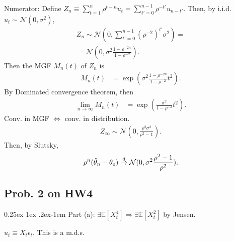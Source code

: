 \documentclass[9pt]{extarticle}
\makeatletter
\newcommand{\EE}{\mathbb{E}}
\renewcommand{\paragraph}{%
  \@startsection{paragraph}{4}%
  {\z@}{0.25ex \@plus 1ex \@minus .2ex}{-1em}%
  {\normalfont\normalsize\bfseries}%
}
\newcommand{\darrow}{\overset{d}{\rightarrow}}
\makeatother
\begin{document}
\begin{multicols*}{4}
Numerator: Define $Z_n \equiv \sum_{t=1}^n \rho^{t-n} u_t = \sum_{t'=0}^{n-1} \rho^{-t'} u_{n-t'}$. Then, by i.i.d. $u_t \sim \mathcal{N}(0, \sigma^2)$,
\begin{gather*}
    Z_n \sim \mathcal{N}(0, \sum_{t'=0}^{n-1} (\rho^{-2})^{t'}\sigma^2) = \\
    = \mathcal{N}(0, \sigma^2\frac{1-\rho^{-2n}}{1-\rho^{-2}}).
\end{gather*}
Then the MGF $M_n(t)$ of $Z_n$ is
\begin{align*}
    M_n(t) &= \exp(\sigma^2\frac{1-\rho^{-2n}}{1-\rho^{-2}} t^2).
\end{align*}
By Dominated convergence theorem, then
\begin{align*}
    \lim_{n \rightarrow \infty} M_n(t) &= \exp(\frac{\sigma^2}{1-\rho^{-2}}t^2).
\end{align*}
Conv. in MGF $\Leftrightarrow$ conv. in distribution.
\begin{align*}
    Z_\infty \sim \mathcal{N}(0, \frac{\rho^2\sigma^2}{\rho^2-1}).
\end{align*}
Then, by Slutsky,
\begin{align*}
    \rho^n(\hth_n - \theta_o) \darrow \mathcal{N}(0, \sigma^2\frac{\rho^2-1}{\rho^2}).
\end{align*}

\subsection*{Prob. 2 on HW4}
\paragraph{Part (a):}
$\exists \EE[X_t^4] \Rightarrow \exists \EE[X_t^2]$ by Jensen.

$u_t \equiv X_t \epsilon_t$. This is a m.d.s.


\end{multicols*}
\end{document}
